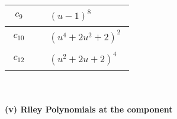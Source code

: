 \documentclass[1p]{elsarticle_modified}
\theoremstyle{definition}
\begin{document}
\begin{tabular}{m{50pt}|m{274pt}}
\hline $$\begin{aligned}c_{9}\end{aligned}$$&$\begin{aligned}
&(u-1)^8
\end{aligned}$\\
\hline $$\begin{aligned}c_{10}\end{aligned}$$&$\begin{aligned}
&(u^4+2 u^2+2)^2
\end{aligned}$\\
\hline $$\begin{aligned}c_{12}\end{aligned}$$&$\begin{aligned}
&(u^2+2 u+2)^4
\end{aligned}$\\
\hline
\end{tabular}\\~\\
\newpage\renewcommand{\arraystretch}{1}
\flushleft \textbf{(v) Riley Polynomials at the component}\newline \\
\end{document}
